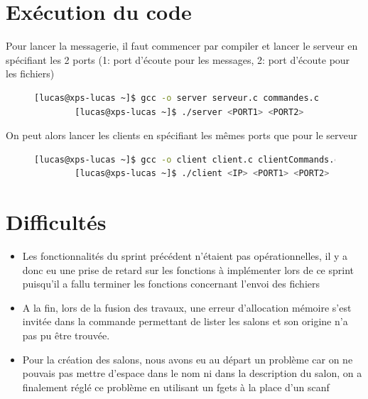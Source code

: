 \documentclass[a4paper,12pt]{article}
\begin{document}
\section{Exécution du code}
Pour lancer la messagerie, il faut commencer par compiler et lancer le serveur en spécifiant les 2 ports (1: port d'écoute pour les messages, 2: port d'écoute pour les fichiers)
\begin{figure}[h]
	\centering
	\vspace{-0.1cm}
	\begin{lstlisting}[language=bash, gobble=4]
		[lucas@xps-lucas ~]$ gcc -o server serveur.c commandes.c
		[lucas@xps-lucas ~]$ ./server <PORT1> <PORT2>
	\end{lstlisting}
\end{figure}

\noindent On peut alors lancer les clients en spécifiant les mêmes ports que pour le serveur
\begin{figure}[h]
	\centering
	\vspace{-0.2cm}
	\begin{lstlisting}[language=bash, gobble=4]
		[lucas@xps-lucas ~]$ gcc -o client client.c clientCommands.c
		[lucas@xps-lucas ~]$ ./client <IP> <PORT1> <PORT2>
	\end{lstlisting}
\end{figure}
\section{Difficultés}
\begin{itemize}
	\item Les fonctionnalités du sprint précédent n'étaient pas opérationnelles, il y a donc eu une prise de retard sur les fonctions à implémenter lors de ce sprint puisqu'il a fallu terminer les fonctions concernant l'envoi des fichiers
	\item A la fin, lors de la fusion des travaux, une erreur d'allocation mémoire s'est invitée dans la commande permettant de lister les salons et son origine n'a pas pu être trouvée.
	\item Pour la création des salons, nous avons eu au départ un problème car on ne pouvais pas mettre d'espace dans le nom ni dans la description du salon, on a finalement réglé ce problème en utilisant un fgets à la place d'un scanf
\end{itemize}
\end{document}
